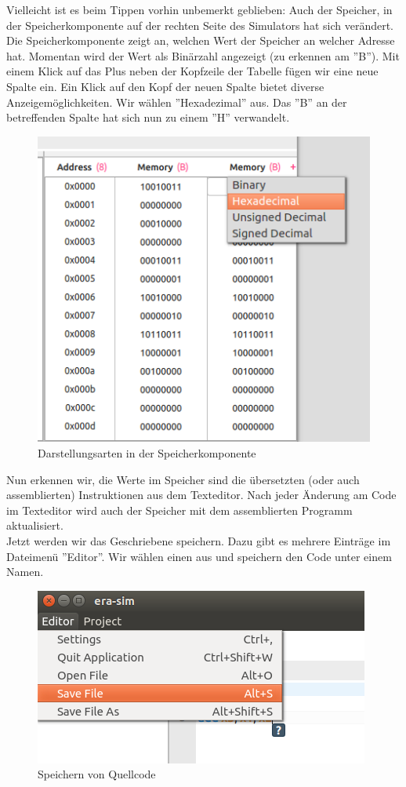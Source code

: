 Vielleicht ist es beim Tippen vorhin unbemerkt geblieben: Auch der Speicher, in
der Speicherkomponente auf der rechten Seite des Simulators hat sich verändert.
Die Speicherkomponente zeigt an, welchen Wert der Speicher an welcher Adresse
hat. Momentan wird der Wert als Binärzahl angezeigt (zu erkennen am ''B''). Mit
einem Klick auf das Plus neben der Kopfzeile der Tabelle fügen wir eine neue
Spalte ein. Ein Klick auf den Kopf der neuen Spalte bietet diverse
Anzeigemöglichkeiten. Wir wählen ''Hexadezimal'' aus. Das ''B'' an der
betreffenden Spalte hat sich nun zu einem ''H'' verwandelt.
\begin{figure}[H]
	\centering
	\includegraphics[scale=1.0]{Images/first-steps-6.png}
	\caption{Darstellungsarten in der Speicherkomponente}
\end{figure}

Nun erkennen wir, die Werte im Speicher sind die übersetzten (oder auch
assemblierten) Instruktionen aus dem Texteditor. Nach jeder Änderung am Code im
Texteditor wird auch der Speicher mit dem assemblierten Programm aktualisiert.\\
Jetzt werden wir das Geschriebene speichern. Dazu gibt es mehrere Einträge im
Dateimenü ''Editor''. Wir wählen einen aus und speichern den Code unter einem
Namen.
\begin{figure}[H]
	\centering
	\includegraphics[scale=1.0]{Images/first-steps-7.png}
	\caption{Speichern von Quellcode}
\end{figure}

